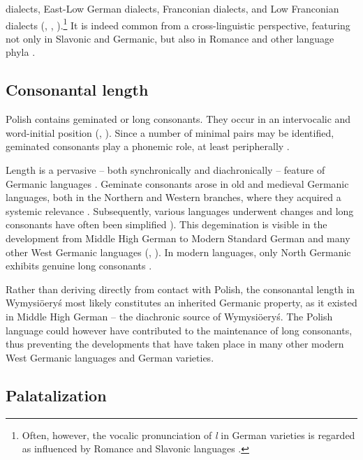 \documentclass[output=paper,hidelinks]{langscibook}
\begin{document}
dialects, East-Low German dialects, Franconian dialects, and Low Franconian dialects (\citealt{selmer_velarization_1933}, \citealt[1111--1112]{besch_dialektologie_1983}, \citealt{leemann_diffusion_2014}).\footnote{Often, however, the vocalic pronunciation of \textit{l} in German varieties is regarded as influenced by Romance and Slavonic languages \citep[235--238, 243]{selmer_velarization_1933}.} It is indeed common from a cross-linguistic perspective, featuring not only in Slavonic and Germanic, but also in Romance and other language phyla \citep{zak2019pewnym}.

\subsection{Consonantal length}\label{sec:wymsorys:4.5}

Polish contains geminated or long consonants. They occur in an intervocalic and word-initial position (\citealt[241]{gussmann_phonology_2007}, \citealt[82]{wagiel_fonematyka_2016}). Since a number of minimal pairs may be identified, geminated consonants play a phonemic role, at least peripherally \citep[82]{wagiel_fonematyka_2016}.

Length is a pervasive – both synchronically and diachronically – feature of Germanic languages \citep[74--79]{harbert_germanic_2007}. Geminate consonants arose in old and medieval Germanic languages, both in the Northern and Western branches, where they acquired a systemic relevance \citep[74--75]{harbert_germanic_2007}. Subsequently, various languages underwent changes and long consonants have often been simplified \citep[75--78]{lass_phonology_1992, harbert_germanic_2007}). This degemination is visible in the development from Middle High German to Modern Standard German and many other West Germanic languages (\citealt[76--78]{harbert_germanic_2007}, \citealt{schmidt_einfuhrung_2017}). In modern languages, only North Germanic exhibits genuine long consonants \citep[78--79]{harbert_germanic_2007}.

Rather than deriving directly from contact with Polish, the consonantal length in Wymysiöeryś most likely constitutes an inherited Germanic property, as it existed in Middle High German – the diachronic source of Wymysiöeryś. The Polish language could however have contributed to the maintenance of long consonants, thus preventing the developments that have taken place in many other modern West Germanic languages and German varieties. 

\subsection{Palatalization}\label{sec:wymsorys:4.6}
\end{document}
